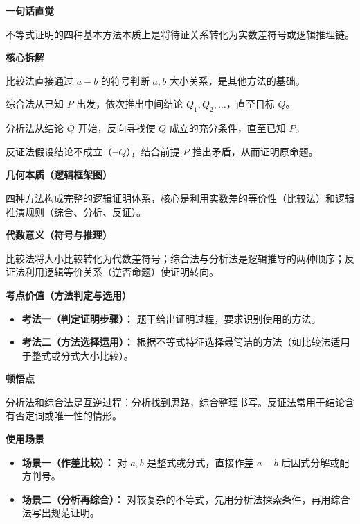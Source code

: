 \begin{explanationbox}

	\textbf{\textcolor{CExplanation}{一句话直觉}}

	不等式证明的四种基本方法本质上是将待证关系转化为实数差符号或逻辑推理链。

	\medskip
	\textbf{\textcolor{CExplanation}{核心拆解}}
	\begin{description}[style=nextline, leftmargin=2.8em, labelsep=0.5em, itemsep=0.45em]
		\item[\textbf{要点一（差符号转化）：}] 比较法直接通过 $a-b$ 的符号判断 $a,b$ 大小关系，是其他方法的基础。
		\item[\textbf{要点二（正向因果链）：}] 综合法从已知 $P$ 出发，依次推出中间结论 $Q_1,Q_2,\dots$，直至目标 $Q$。
		\item[\textbf{要点三（逆向追溯链）：}] 分析法从结论 $Q$ 开始，反向寻找使 $Q$ 成立的充分条件，直至已知 $P$。
		\item[\textbf{要点四（矛盾否定）：}] 反证法假设结论不成立（$\neg Q$），结合前提 $P$ 推出矛盾，从而证明原命题。
	\end{description}

	\medskip
	\textbf{\textcolor{CExplanation}{几何本质（逻辑框架图）}}

	四种方法构成完整的逻辑证明体系，核心是利用实数差的等价性（比较法）和逻辑推演规则（综合、分析、反证）。

	\medskip
	\textbf{\textcolor{CExplanation}{代数意义（符号与推理）}}

	比较法将大小比较转化为代数差符号；综合法与分析法是逻辑推导的两种顺序；反证法利用逻辑等价关系（逆否命题）使证明转向。

	\medskip
	\textbf{\textcolor{CExplanation}{考点价值（方法判定与选用）}}
	\begin{itemize}[leftmargin=*, itemsep=0.5em, topsep=0.4em]
		\item \textbf{考法一（判定证明步骤）：} 题干给出证明过程，要求识别使用的方法。
		\item \textbf{考法二（方法选择运用）：} 根据不等式特征选择最简洁的方法（如比较法适用于整式或分式大小比较）。
	\end{itemize}

	\medskip
	\textbf{\textcolor{CExplanation}{顿悟点}}

	分析法和综合法是互逆过程：分析找到思路，综合整理书写。反证法常用于结论含有否定词或唯一性的情形。

	\medskip
	\textbf{\textcolor{CExplanation}{使用场景}}
	\begin{itemize}[leftmargin=*, itemsep=0.5em, topsep=0.4em]
		\item \textbf{场景一（作差比较）：} 对 $a,b$ 是整式或分式，直接作差 $a-b$ 后因式分解或配方判号。
		\item \textbf{场景二（分析再综合）：} 对较复杂的不等式，先用分析法探索条件，再用综合法写出规范证明。
	\end{itemize}
\end{explanationbox}
